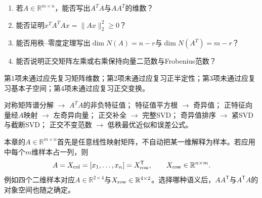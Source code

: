 \begin{precheckbox}
\begin{enumerate}[leftmargin=2.2em]
  \item 若$A\in\mathbb R^{m\times n}$，能否写出$A^TA$与$AA^T$的维数？
  \item 能否证明$x^TA^TAx=\|Ax\|_2^2\geq0$？
  \item 能否用秩--零度定理写出$\dim N(A)=n-r$与$\dim N(A^T)=m-r$？
  \item 能否说明正交矩阵左乘或右乘保持向量二范数与Frobenius范数？
\end{enumerate}
第1项未通过应先复习矩阵维数；第2项未通过应复习正半定性；第3项未通过应复习基本子空间；第4项未通过应复习正交变换。
\end{precheckbox}

\label{struct:V4-C03-CH04}
\begin{dependencybox}
对称矩阵谱分解 $\to$ $A^TA$的非负特征值；
特征值平方根 $\to$ 奇异值；
正特征向量经$A$映射 $\to$ 左奇异向量；
正交补全 $\to$ 完整SVD；
奇异值排序 $\to$ 紧SVD与截断SVD；
正交不变范数 $\to$ 低秩最优近似和误差公式。
\end{dependencybox}

\begin{keypointbox}[title=数据方向桥：SVD先看线性映射，再看样本]
本章的$A\in\mathbb R^{m\times n}$首先是任意线性映射矩阵，不自动把某一维解释为样本。若应用中每个$m$维样本占一列，则
\[
A=X_{\rm col}=[x_1,\ldots,x_n]
=X_{\rm row}^{\mathsf T},
\qquad X_{\rm row}\in\mathbb R^{n\times m}.
\]
例如四个二维样本对应$A\in\mathbb R^{2\times4}$与$X_{\rm row}\in\mathbb R^{4\times2}$。选择哪种语义后，$AA^{\mathsf T}$与$A^{\mathsf T}A$的对象空间也随之确定。
\end{keypointbox}

